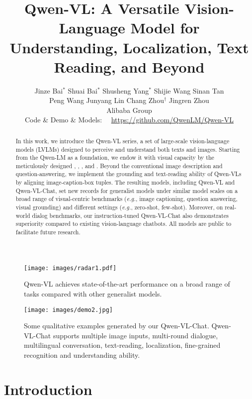 \documentclass{article}
\title{
\textbf{
Qwen-VL: A Versatile Vision-Language Model for Understanding, Localization, Text Reading, and Beyond}
}
\author{
\large{}
Jinze Bai$^*$ \hspace{6mm} Shuai Bai$^*$ \hspace{6mm} Shusheng Yang$^*$ \hspace{6mm} Shijie Wang \hspace{6mm} Sinan Tan\\
Peng Wang \hspace{6mm} Junyang Lin \hspace{6mm} Chang Zhou$^{\dag}$ \hspace{6mm} Jingren Zhou
\\
\large{}
Alibaba Group
\\
\small{}
Code \& Demo \& Models: \ \ \url{https://github.com/QwenLM/Qwen-VL}
}
\date{}
\begin{document}
\doparttoc \faketableofcontents 

\maketitle

\begin{abstract}
\noindent
In this work, we introduce the Qwen-VL series, a set of large-scale vision-language models (LVLMs) designed to perceive and understand both texts and images.
Starting from the Qwen-LM as a foundation, we endow it with visual capacity by the meticulously designed , , , and .
Beyond the conventional image description and question-answering, we implement the grounding and text-reading ability of Qwen-VLs by aligning image-caption-box tuples.
The resulting models, including Qwen-VL and Qwen-VL-Chat, set new records for generalist models under similar model scales on a broad range of visual-centric benchmarks (\emph{e.g.}, image captioning, question answering, visual grounding) and different settings (\emph{e.g.}, zero-shot, few-shot).
Moreover, on real-world dialog benchmarks, our instruction-tuned Qwen-VL-Chat also demonstrates superiority compared to existing vision-language chatbots.
All models are public to facilitate future research.
\end{abstract}

{\let\thefootnote\relax{}}




\begin{figure*}[h]
\centering
\texttt{[image: images/radar1.pdf]}
   \caption{Qwen-VL achieves state-of-the-art performance on a broad range of tasks compared with other generalist models.}
\label{radar}
\end{figure*}

\begin{figure*}[t]
\centering
\texttt{[image: images/demo2.jpg]}
\caption{Some qualitative examples generated by our Qwen-VL-Chat. Qwen-VL-Chat supports multiple image inputs, multi-round dialogue, multilingual conversation, text-reading, localization, fine-grained recognition and understanding ability.}
\label{example}
\end{figure*}

\section{Introduction}
\end{document}
